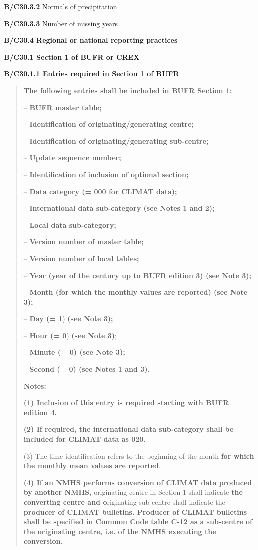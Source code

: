 \textbf{B/C30.3.2} Normals of precipitation

\textbf{B/C30.3.3} Number of missing years

\textbf{B/C30.4 Regional or national reporting practices}

\textbf{B/C30.1 Section 1 of BUFR or CREX}

\textbf{B/C30.1.1 Entries required in Section 1 of BUFR}

\begin{quote}
\textbf{The following entries shall be included in BUFR Section 1:}

-- \textbf{BUFR master table;}

-- \textbf{Identification of originating/generating centre;}

-- \textbf{Identification of originating/generating sub-centre;}

-- \textbf{Update sequence number;}

-- \textbf{Identification of inclusion of optional section;}

-- \textbf{Data category (= 000 for CLIMAT data);}

-- \textbf{International data sub-category (see Notes 1 and 2);}

-- \textbf{Local data sub-category;}

-- \textbf{Version number of master table;}

-- \textbf{Version number of local tables;}

-- \textbf{Year (year of the century up to BUFR edition 3) (see Note 3);}

-- \textbf{Month (for which the monthly values are reported) (see Note 3);}

-- \textbf{Day (= 1}) \textbf{(see Note 3);}

-- \textbf{Hour (= 0}) \textbf{(see Note 3)};

-- \textbf{Minute (= 0) (see Note 3);}

-- \textbf{Second (= 0) (see Notes 1 and 3).}

\textbf{Notes:}

\textbf{(1) Inclusion of this entry is required starting with BUFR edition 4.}

\textbf{(2) If required, the international data sub-category shall be included for CLIMAT data as 020.}

(3) The time identification refers to the beginning of the month \textbf{for which the monthly mean values are reported}.

\textbf{(4) If an NMHS performs conversion of CLIMAT data produced by another NMHS,} originating centre in Section 1 shall indicate \textbf{the converting centre and o}riginating sub-centre shall indicate the \textbf{producer of CLIMAT bulletins. Producer of CLIMAT bulletins shall be specified in Common Code table C-12 as a sub-centre of the originating centre, i.e. of the NMHS executing the conversion.}
\end{quote}

